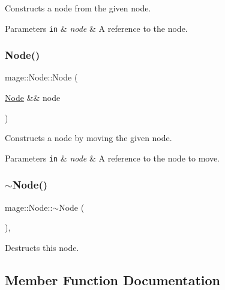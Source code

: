 Constructs a node from the given node.


\begin{DoxyParams}[1]{Parameters}
\mbox{\tt in}  & {\em node} & A reference to the node. \\
\hline
\end{DoxyParams}
\hypertarget{classmage_1_1_node_adbc40b6c4100f74faa2b59a7a0b79388}{}\label{classmage_1_1_node_adbc40b6c4100f74faa2b59a7a0b79388} 
\subsubsection{\texorpdfstring{Node()}{Node()}\hspace{0.1cm}{\footnotesize\ttfamily [3/3]}}
{\footnotesize\ttfamily mage\+::\+Node\+::\+Node (\begin{DoxyParamCaption}\item[{\hyperlink{classmage_1_1_node}{Node} \&\&}]{node }\end{DoxyParamCaption})\hspace{0.3cm}{\ttfamily [default]}}

Constructs a node by moving the given node.


\begin{DoxyParams}[1]{Parameters}
\mbox{\tt in}  & {\em node} & A reference to the node to move. \\
\hline
\end{DoxyParams}
\hypertarget{classmage_1_1_node_a1369fc11b331abacbaf11aeb5729e871}{}\label{classmage_1_1_node_a1369fc11b331abacbaf11aeb5729e871} 
\subsubsection{\texorpdfstring{$\sim$\+Node()}{~Node()}}
{\footnotesize\ttfamily mage\+::\+Node\+::$\sim$\+Node (\begin{DoxyParamCaption}{ }\end{DoxyParamCaption})\hspace{0.3cm}{\ttfamily [virtual]}, {\ttfamily [default]}}

Destructs this node. 

\subsection{Member Function Documentation}
\hypertarget{classmage_1_1_node_aefa62a09afd2b0d314a64e6d45f45a34}{}\label{classmage_1_1_node_aefa62a09afd2b0d314a64e6d45f45a34} 
